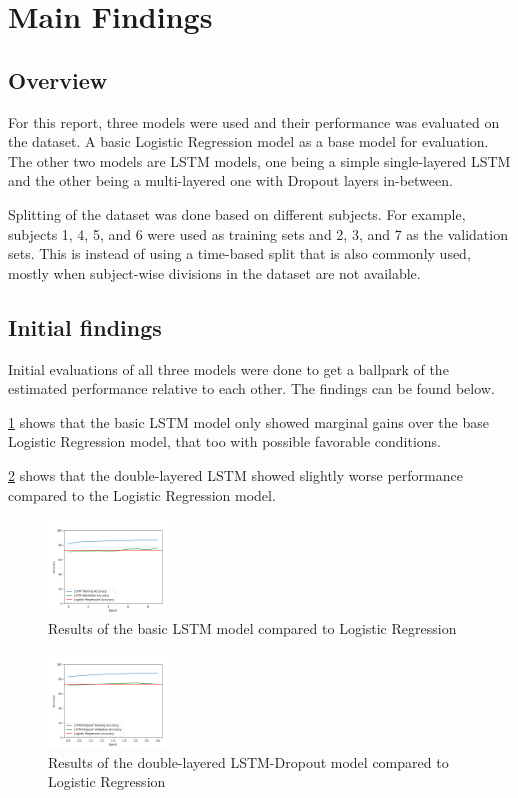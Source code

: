 \documentclass{article}
\begin{document}
\section{Main Findings}

\subsection{Overview}
For this report, three models were used and their performance was evaluated on the dataset. A basic Logistic Regression model as a base model for evaluation. The other two models are LSTM models, one being a simple single-layered LSTM and the other being a multi-layered one with Dropout layers in-between.

Splitting of the dataset was done based on different subjects. For example, subjects 1, 4, 5, and 6 were used as training sets and 2, 3, and 7 as the validation sets. This is instead of using a time-based split that is also commonly used, mostly when subject-wise divisions in the dataset are not available.

\subsection{Initial findings}
Initial evaluations of all three models were done to get a ballpark of the estimated performance relative to each other. The findings can be found below.

\ref{fig:basic_lstm_log_reg} shows that the basic LSTM model only showed marginal gains over the base Logistic Regression model, that too with possible favorable conditions.

\ref{fig:lstm_dropout_log_reg} shows that the double-layered LSTM showed slightly worse performance compared to the Logistic Regression model.

\begin{figure}[h]
\centering
\includegraphics[width=0.3\textwidth]{report/basic_lstm_log_reg.png}
\caption{\label{fig:basic_lstm_log_reg}Results of the basic LSTM model compared to Logistic Regression}
\end{figure}

\begin{figure}[h]
\centering
\includegraphics[width=0.3\textwidth]{report/lstm_dropout_log_reg.png}
\caption{\label{fig:lstm_dropout_log_reg}Results of the double-layered LSTM-Dropout model compared to Logistic Regression}
\end{figure}
\end{document}
